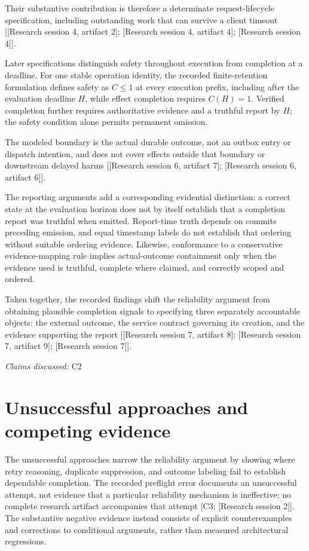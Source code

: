 \documentclass[11pt]{article}
\begin{document}
Their substantive contribution is therefore a determinate request-lifecycle specification, including outstanding work that can survive a client timeout [[Research session 4, artifact 2]; [Research session 4, artifact 4]; [Research session 4]].

Later specifications distinguish safety throughout execution from completion at a deadline. For one stable operation identity, the recorded finite-retention formulation defines safety as $C\leq1$ at every execution prefix, including after the evaluation deadline $H$, while effect completion requires $C(H)=1$. Verified completion further requires authoritative evidence and a truthful report by $H$; the safety condition alone permits permanent omission.

The modeled boundary is the actual durable outcome, not an outbox entry or dispatch intention, and does not cover effects outside that boundary or downstream delayed harms [[Research session 6, artifact 7]; [Research session 6, artifact 6]].

The reporting arguments add a corresponding evidential distinction: a correct state at the evaluation horizon does not by itself establish that a completion report was truthful when emitted. Report-time truth depends on commits preceding emission, and equal timestamp labels do not establish that ordering without suitable ordering evidence. Likewise, conformance to a conservative evidence-mapping rule implies actual-outcome containment only when the evidence used is truthful, complete where claimed, and correctly scoped and ordered.

Taken together, the recorded findings shift the reliability argument from obtaining plausible completion signals to specifying three separately accountable objects: the external outcome, the service contract governing its creation, and the evidence supporting the report [[Research session 7, artifact 8]; [Research session 7, artifact 9]; [Research session 7]].

\textit{Claims discussed: }C2
\section{Unsuccessful approaches and competing evidence}
The unsuccessful approaches narrow the reliability argument by showing where retry reasoning, duplicate suppression, and outcome labeling fail to establish dependable completion. The recorded preflight error documents an unsuccessful attempt, not evidence that a particular reliability mechanism is ineffective; no complete research artifact accompanies that attempt [C3; [Research session 2]]. The substantive negative evidence instead consists of explicit counterexamples and corrections to conditional arguments, rather than measured architectural regressions.
\end{document}

